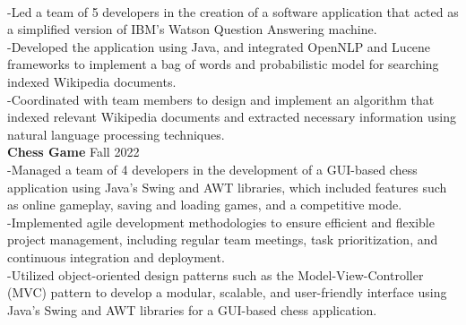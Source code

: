 \documentclass[10pt]{book}
\begin{document}
{        \\
        \hspace{2pt}-\hspace{6pt}Led a team of 5 developers in the creation of a software application that acted as a simplified version of IBM's Watson Question Answering machine.
        \\
        \hspace{2pt}-\hspace{6pt}Developed the application using Java, and integrated OpenNLP and Lucene frameworks to implement a bag of words and probabilistic model for searching 
                                indexed Wikipedia documents.
        \\
        \hspace{2pt}-\hspace{6pt}Coordinated with team members to design and implement an algorithm that indexed relevant Wikipedia documents and extracted necessary information using natural 
                                language processing techniques.
        \\
        {
            \noindent\fontsize{11}{11}
            \selectfont\hspace{-3pt}\textbf{Chess Game \textendash}\hfill Fall 2022
        }
        \\
        \hspace{2pt}-\hspace{6pt}Managed a team of 4 developers in the development of a GUI-based chess application using Java's Swing and AWT libraries, which included features such 
                                as online gameplay, saving and loading games, and a competitive mode.
        \\
        \hspace{2pt}-\hspace{6pt}Implemented agile development methodologies to ensure efficient and flexible project management, including regular team meetings, task prioritization, 
                                and continuous integration and deployment.
        \\
        \hspace{2pt}-\hspace{6pt}Utilized object-oriented design patterns such as the Model-View-Controller (MVC) pattern to develop a modular, scalable, and user-friendly interface 
                                using Java's Swing and AWT libraries for a GUI-based chess application.
        \\
}
\end{document}
